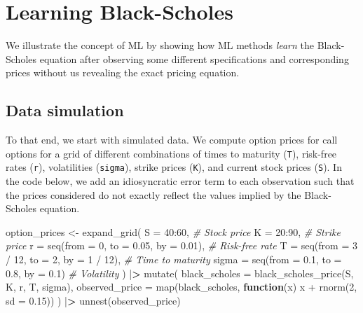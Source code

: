 \documentclass[
]{krantz}
\newenvironment{Shaded}{\begin{snugshade}}{\end{snugshade}}
\newcommand{\AttributeTok}[1]{\textcolor[rgb]{0.61,0.61,0.61}{#1}}
\newcommand{\CommentTok}[1]{\textcolor[rgb]{0.37,0.37,0.37}{\textit{#1}}}
\newcommand{\ControlFlowTok}[1]{\textcolor[rgb]{0.27,0.27,0.27}{\textbf{#1}}}
\newcommand{\DecValTok}[1]{\textcolor[rgb]{0.06,0.06,0.06}{#1}}
\newcommand{\ErrorTok}[1]{\textcolor[rgb]{0.14,0.14,0.14}{\textbf{#1}}}
\newcommand{\FloatTok}[1]{\textcolor[rgb]{0.06,0.06,0.06}{#1}}
\newcommand{\FunctionTok}[1]{\textcolor[rgb]{0,0,0}{#1}}
\newcommand{\NormalTok}[1]{#1}
\newcommand{\OtherTok}[1]{\textcolor[rgb]{0.37,0.37,0.37}{#1}}
\newcommand{\SpecialCharTok}[1]{\textcolor[rgb]{0,0,0}{#1}}
\begin{document}
\hypertarget{learning-black-scholes}{%
\section{Learning Black-Scholes}\label{learning-black-scholes}}

We illustrate the concept of ML by showing how ML methods \emph{learn} the Black-Scholes equation after observing some different specifications and corresponding prices without us revealing the exact pricing equation.

\hypertarget{data-simulation}{%
\subsection{Data simulation}\label{data-simulation}}

To that end, we start with simulated data. We compute option prices for call options for a grid of different combinations of times to maturity (\texttt{T}), risk-free rates (\texttt{r}), volatilities (\texttt{sigma}), strike prices (\texttt{K}), and current stock prices (\texttt{S}). In the code below, we add an idiosyncratic error term to each observation such that the prices considered do not exactly reflect the values implied by the Black-Scholes equation.

\begin{Shaded}
\begin{Highlighting}[]
\NormalTok{option\_prices }\OtherTok{\textless{}{-}} \FunctionTok{expand\_grid}\NormalTok{(}
  \AttributeTok{S =} \DecValTok{40}\SpecialCharTok{:}\DecValTok{60}\NormalTok{, }\CommentTok{\# Stock price}
  \AttributeTok{K =} \DecValTok{20}\SpecialCharTok{:}\DecValTok{90}\NormalTok{, }\CommentTok{\# Strike price}
  \AttributeTok{r =} \FunctionTok{seq}\NormalTok{(}\AttributeTok{from =} \DecValTok{0}\NormalTok{, }\AttributeTok{to =} \FloatTok{0.05}\NormalTok{, }\AttributeTok{by =} \FloatTok{0.01}\NormalTok{), }\CommentTok{\# Risk{-}free rate}
  \AttributeTok{T =} \FunctionTok{seq}\NormalTok{(}\AttributeTok{from =} \DecValTok{3} \SpecialCharTok{/} \DecValTok{12}\NormalTok{, }\AttributeTok{to =} \DecValTok{2}\NormalTok{, }\AttributeTok{by =} \DecValTok{1} \SpecialCharTok{/} \DecValTok{12}\NormalTok{), }\CommentTok{\# Time to maturity}
  \AttributeTok{sigma =} \FunctionTok{seq}\NormalTok{(}\AttributeTok{from =} \FloatTok{0.1}\NormalTok{, }\AttributeTok{to =} \FloatTok{0.8}\NormalTok{, }\AttributeTok{by =} \FloatTok{0.1}\NormalTok{) }\CommentTok{\# Volatility}
\NormalTok{) }\SpecialCharTok{|}\ErrorTok{\textgreater{}}
  \FunctionTok{mutate}\NormalTok{(}
    \AttributeTok{black\_scholes =} \FunctionTok{black\_scholes\_price}\NormalTok{(S, K, r, T, sigma),}
    \AttributeTok{observed\_price =} \FunctionTok{map}\NormalTok{(black\_scholes, }
                         \ControlFlowTok{function}\NormalTok{(x) x }\SpecialCharTok{+} \FunctionTok{rnorm}\NormalTok{(}\DecValTok{2}\NormalTok{, }\AttributeTok{sd =} \FloatTok{0.15}\NormalTok{))}
\NormalTok{  ) }\SpecialCharTok{|}\ErrorTok{\textgreater{}}
  \FunctionTok{unnest}\NormalTok{(observed\_price)}
\end{Highlighting}
\end{Shaded}
\end{document}
